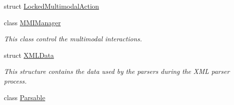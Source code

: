 \begin{DoxyCompactItemize}
struct \hyperlink{structbr_1_1ufscar_1_1lince_1_1mmi_1_1LockedMultimodalAction}{LockedMultimodalAction}
\item 
class \hyperlink{classbr_1_1ufscar_1_1lince_1_1mmi_1_1MMIManager}{MMIManager}
\begin{DoxyCompactList}\small\item\em This class control the multimodal interactions. \item\end{DoxyCompactList}\item 
struct \hyperlink{structbr_1_1ufscar_1_1lince_1_1mmi_1_1XMLData}{XMLData}
\begin{DoxyCompactList}\small\item\em This structure contains the data used by the parsers during the XML parser process. \item\end{DoxyCompactList}\item 
class \hyperlink{classbr_1_1ufscar_1_1lince_1_1mmi_1_1Parsable}{Parsable}
\end{DoxyCompactItemize}
